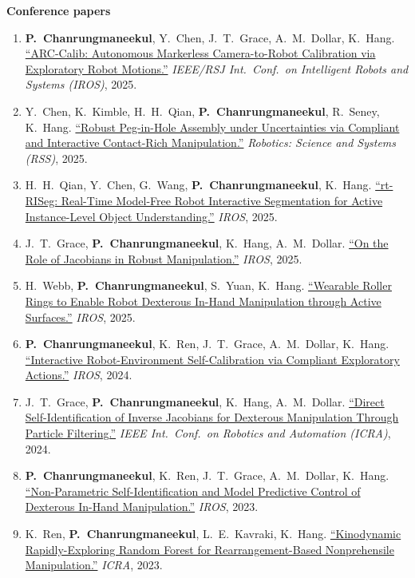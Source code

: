 \documentclass[10pt,letterpaper]{article}
\newcommand{\me}{\textbf{P.~Chanrungmaneekul}}
\newcommand{\venue}[1]{\textit{#1}}
\begin{document}
{\textbf{Conference papers}\par\nopagebreak
\begin{enumerate}[resume]
  \item \me, Y.~Chen, J.~T.~Grace, A.~M.~Dollar, K.~Hang. \href{https://arxiv.org/abs/2503.14701}{``ARC-Calib: Autonomous Markerless Camera-to-Robot
    Calibration via Exploratory Robot Motions.''} \venue{IEEE/RSJ Int.\ Conf.\ on Intelligent Robots and Systems (IROS)}, 2025.
  \item Y.~Chen, K.~Kimble, H.~H.~Qian, \me, R.~Seney, K.~Hang. \href{https://www.roboticsproceedings.org/rss21/p060.pdf}{``Robust Peg-in-Hole Assembly under Uncertainties via
    Compliant and Interactive Contact-Rich Manipulation.''} \venue{Robotics: Science and Systems (RSS)}, 2025.
  \item H.~H.~Qian, Y.~Chen, G.~Wang, \me, K.~Hang. \href{https://arxiv.org/abs/2507.10776}{``rt-RISeg: Real-Time Model-Free Robot Interactive Segmentation
    for Active Instance-Level Object Understanding.''} \venue{IROS}, 2025.
  \item J.~T.~Grace, \me, K.~Hang, A.~M.~Dollar. \href{https://robotpilab.github.io/publication/josh2/Grace_IROS2025.pdf}{``On the Role of Jacobians in Robust Manipulation.''} \venue{IROS}, 2025.
  \item H.~Webb, \me, S.~Yuan, K.~Hang. \href{https://arxiv.org/abs/2403.13132}{``Wearable Roller Rings to Enable Robot Dexterous In-Hand Manipulation
    through Active Surfaces.''} \venue{IROS}, 2025.
  \item \me, K.~Ren, J.~T.~Grace, A.~M.~Dollar, K.~Hang. \href{https://arxiv.org/abs/2403.13144}{``Interactive Robot-Environment Self-Calibration via
    Compliant Exploratory Actions.''} \venue{IROS}, 2024.
  \item J.~T.~Grace, \me, K.~Hang, A.~M.~Dollar. \href{https://ieeexplore.ieee.org/document/10611052}{``Direct Self-Identification of Inverse Jacobians for Dexterous
    Manipulation Through Particle Filtering.''} \venue{IEEE Int.\ Conf.\ on Robotics and Automation (ICRA)}, 2024.
  \item \me, K.~Ren, J.~T.~Grace, A.~M.~Dollar, K.~Hang. \href{https://arxiv.org/abs/2307.10033}{``Non-Parametric Self-Identification and Model Predictive
    Control of Dexterous In-Hand Manipulation.''} \venue{IROS}, 2023.
  \item K.~Ren, \me, L.~E.~Kavraki, K.~Hang. \href{https://arxiv.org/abs/2302.04360}{``Kinodynamic Rapidly-Exploring Random Forest for Rearrangement-Based
    Nonprehensile Manipulation.''} \venue{ICRA}, 2023.
\end{enumerate}

}
\end{document}
